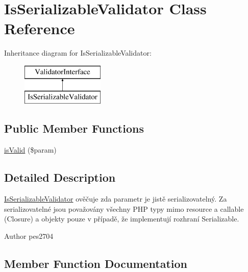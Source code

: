 \hypertarget{class_pes_1_1_validator_1_1_is_serializable_validator}{}\section{Is\+Serializable\+Validator Class Reference}
\label{class_pes_1_1_validator_1_1_is_serializable_validator}
Inheritance diagram for Is\+Serializable\+Validator\+:\begin{figure}[H]
\begin{center}
\leavevmode
\includegraphics[height=2.000000cm]{class_pes_1_1_validator_1_1_is_serializable_validator}
\end{center}
\end{figure}
\subsection*{Public Member Functions}
\begin{DoxyCompactItemize}
\item 
\mbox{\hyperlink{class_pes_1_1_validator_1_1_is_serializable_validator_a250dbda694ce9c4d0dd4e71e1df35882}{is\+Valid}} (\$param)
\end{DoxyCompactItemize}


\subsection{Detailed Description}
\mbox{\hyperlink{class_pes_1_1_validator_1_1_is_serializable_validator}{Is\+Serializable\+Validator}} ověčuje zda parametr je jistě serializovatelný. Za serializovatelné jsou považovány všechny P\+HP typy mimo resource a callable (Closure) a objekty pouze v případě, že implementují rozhraní Serializable.

\begin{DoxyAuthor}{Author}
pes2704 
\end{DoxyAuthor}


\subsection{Member Function Documentation}
\mbox{\label{class_pes_1_1_validator_1_1_is_serializable_validator_a250dbda694ce9c4d0dd4e71e1df35882}} 
